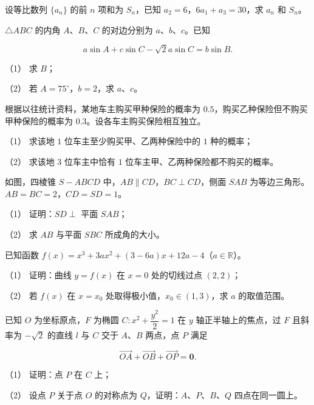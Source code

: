 \begin{question}
设等比数列 $\{a_n\}$ 的前 $n$ 项和为 $S_n$，已知 $a_2=6$，$6a_1+a_3=30$，求 $a_n$ 和 $S_n$。

\end{question}
\begin{question}
$\triangle ABC$ 的内角 $A\text{、}B\text{、}C$ 的对边分别为 $a\text{、}b\text{、}c$。已知

\nopagebreak[4]
\[
a\sin A+c\sin C-\sqrt2a\sin C=b\sin B.
\]

（1） 求 $B$；

（2） 若 $A=75^\circ$，$b=2$，求 $a\text{、}c$。

\end{question}
\begin{question}
根据以往统计资料，某地车主购买甲种保险的概率为 $0.5$，购买乙种保险但不购买甲种保险的概率为 $0.3$。设各车主购买保险相互独立。

（1） 求该地 $1$ 位车主至少购买甲、乙两种保险中的 $1$ 种的概率；

（2） 求该地 $3$ 位车主中恰有 $1$ 位车主甲、乙两种保险都不购买的概率。

\Needspace{0.4\textheight}
\end{question}
\begin{question}
如图，四棱锥 $S-ABCD$ 中，$AB\parallel CD$，$BC\perp CD$，侧面 $SAB$ 为等边三角形。$AB=BC=2$，$CD=SD=1$。
\nopagebreak[4]
\begin{center}\end{center}
\nopagebreak[4]
（1） 证明：$SD\perp$ 平面 $SAB$；

（2） 求 $AB$ 与平面 $SBC$ 所成角的大小。

\end{question}
\begin{question}
已知函数 $f(x)=x^3+3ax^2+(3-6a)x+12a-4$（$a\in\mathbb R$）。

（1） 证明：曲线 $y=f(x)$ 在 $x=0$ 处的切线过点 $(2,2)$；

（2） 若 $f(x)$ 在 $x=x_0$ 处取得极小值，$x_0\in(1,3)$，求 $a$ 的取值范围。

\Needspace{0.4\textheight}
\end{question}
\begin{question}
已知 $O$ 为坐标原点，$F$ 为椭圆 $C:x^2+\dfrac{y^2}{2}=1$ 在 $y$ 轴正半轴上的焦点，过 $F$ 且斜率为 $-\sqrt2$ 的直线 $l$ 与 $C$ 交于 $A\text{、}B$ 两点，点 $P$ 满足

\nopagebreak[4]
\[
\overrightarrow{OA}+\overrightarrow{OB}+\overrightarrow{OP}=\boldsymbol0.
\]
\nopagebreak[4]
\begin{center}\end{center}
\nopagebreak[4]
（1） 证明：点 $P$ 在 $C$ 上；

（2） 设点 $P$ 关于点 $O$ 的对称点为 $Q$，证明：$A\text{、}P\text{、}B\text{、}Q$ 四点在同一圆上。

\end{question}